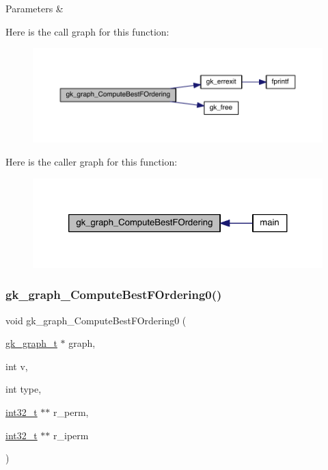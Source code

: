 \begin{DoxyParams}{Parameters}
{\em } & \\
\hline
\end{DoxyParams}
Here is the call graph for this function\+:\nopagebreak
\begin{figure}[H]
\begin{center}
\leavevmode
\includegraphics[width=350pt]{a00846_ab06073efcea470e57620d447548b2aca_cgraph}
\end{center}
\end{figure}
Here is the caller graph for this function\+:\nopagebreak
\begin{figure}[H]
\begin{center}
\leavevmode
\includegraphics[width=324pt]{a00846_ab06073efcea470e57620d447548b2aca_icgraph}
\end{center}
\end{figure}
\mbox{\label{a00846_a698b40792daaa90d9a47c2dcfd2c07d3}} 
\subsubsection{\texorpdfstring{gk\+\_\+graph\+\_\+\+Compute\+Best\+F\+Ordering0()}{gk\_graph\_ComputeBestFOrdering0()}}
{\footnotesize\ttfamily void gk\+\_\+graph\+\_\+\+Compute\+Best\+F\+Ordering0 (\begin{DoxyParamCaption}\item[{\hyperlink{a00638}{gk\+\_\+graph\+\_\+t} $\ast$}]{graph,  }\item[{int}]{v,  }\item[{int}]{type,  }\item[{\hyperlink{a00119_a37994e3b11c72957c6f454c6ec96d43d}{int32\+\_\+t} $\ast$$\ast$}]{r\+\_\+perm,  }\item[{\hyperlink{a00119_a37994e3b11c72957c6f454c6ec96d43d}{int32\+\_\+t} $\ast$$\ast$}]{r\+\_\+iperm }\end{DoxyParamCaption})}

